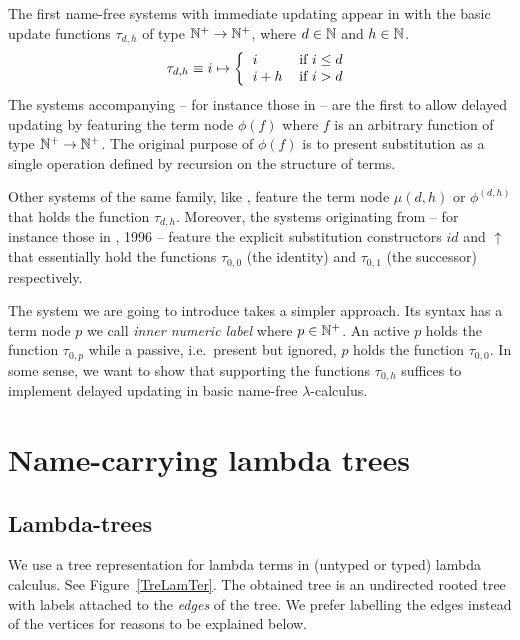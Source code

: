 \documentclass{article}
\theoremstyle{plain}
\theoremstyle{definition}
\begin{document}
The first name-free systems with immediate updating appear in \cite{deB72}
with the basic update functions $\tau_{d,h}$ of type $\mathbb{N}^+ \to \mathbb{N}^+$,
where $d\in\mathbb{N}$ and $h\in\mathbb{N}$.
\[
\tau_{d,h} \equiv i \mapsto
\left\{\begin{tabular}{ll}
$i$&if $i \le d$\\
$i+h$&if $i > d$\\
\end{tabular}\right.
\]
The systems accompanying \cite{deB78b}
-- for instance those in \cite{deB77,deB78a} -- 
are the first to allow delayed updating
by featuring the term node $\phi(f)$
where $f$ is an arbitrary function of type $\mathbb{N}^+ \to \mathbb{N}^+$. The original purpose of $\phi(f)$ is to present substitution as a single operation defined by recursion on the structure of terms.


Other systems of the same family, like \cite{Ned79,Ned80,KN93},
feature the term node $\mu(d,h)$ or $\phi^{(d,h)}$
that holds the function $\tau_{d,h}$.
Moreover, the systems originating from \cite{Aba91}
-- for instance those in \citealp{CHL96}, 1996 -- 
feature the explicit substitution constructors $\mathit{id}$ and $\uparrow$
that essentially hold the functions $\tau_{0,0}$ (the identity)
and $\tau_{0,1}$ (the successor) respectively.

The system we are going to introduce takes a simpler approach.
Its syntax has a term node $p$ we call {\em inner numeric label\/}
where $p \in \mathbb{N}^+$.
An active $p$ holds the function $\tau_{0,p}$
while a passive, i.e.\ present but ignored, $p$ holds the function $\tau_{0,0}$.
In some sense, we want to show that supporting the functions $\tau_{0,h}$
suffices to implement delayed updating in basic name-free $\lambda$-calculus.


\section{Name-carrying lambda trees}\label{AutFor}

\subsection{Lambda-trees}

We use a tree representation for lambda terms in (untyped or typed) lambda calculus. See Figure~\ref{TreLamTer}. The obtained tree is an undirected rooted tree with labels attached to the {\em edges\/} of the tree. We prefer labelling the edges instead of the vertices for reasons to be explained below.
\end{document}
